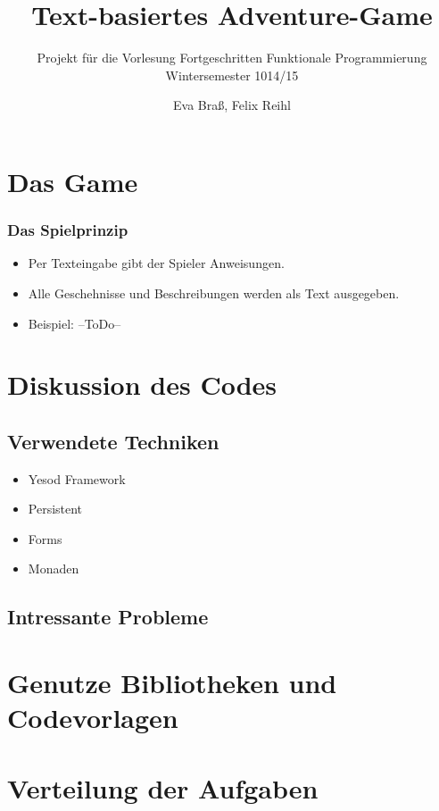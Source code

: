 \documentclass[hyperref={pdfpagelabels=false}]{beamer}
\title{Text-basiertes Adventure-Game}
\author{Eva Braß, Felix Reihl}
\subtitle{Projekt für die Vorlesung Fortgeschritten Funktionale Programmierung\\Wintersemester 1014/15}
\begin{document}
\begin{frame} \titlepage
\end{frame} 
\begin{frame}
	\tableofcontents
\end{frame} 
\section{Das Game}
\begin{frame}
	\frametitle{Das Spielprinzip}
		\begin{itemize}
		\item Per Texteingabe gibt der Spieler Anweisungen.
		\item Alle Geschehnisse und Beschreibungen werden als Text ausgegeben.
		\item Beispiel: --ToDo--
		\end{itemize}
\end{frame} 
\section{Diskussion des Codes}
\begin{frame}
\end{frame}
\subsection{Verwendete Techniken}
\begin{frame}
		\begin{itemize}
		\item Yesod Framework
		\item Persistent
		\item Forms
		\item Monaden
		\end{itemize}
\end{frame}
\subsection{Intressante Probleme}
\begin{frame}
\end{frame}
\section{Genutze Bibliotheken und Codevorlagen}
\begin{frame}
\end{frame}
\section{Verteilung der Aufgaben}
\begin{frame}
\end{frame}
\end{document}
